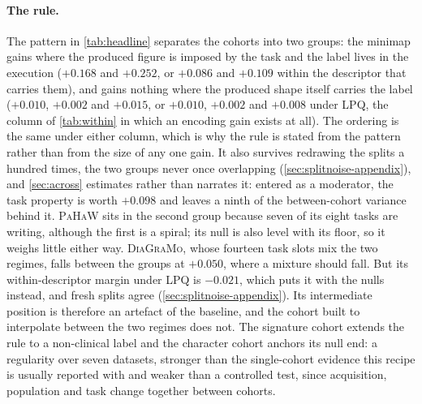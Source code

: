 \documentclass[10pt,a4paper]{article}
\begin{document}
\paragraph{The rule.} The pattern in \cref{tab:headline} separates the cohorts into two groups: the
minimap gains where the produced figure is imposed by the task and the label lives in the execution
($+0.168$ and $+0.252$, or $+0.086$ and $+0.109$ within the descriptor that carries them), and gains
nothing where the produced shape itself carries the label ($+0.010$, $+0.002$ and $+0.015$, or
$+0.010$, $+0.002$ and $+0.008$ under LPQ, the column of \cref{tab:within} in which an encoding gain
exists at all). The ordering is the same under either column, which is why the rule is stated from
the pattern rather than from the size of any one gain. It also survives redrawing the splits a
hundred times, the two groups never once overlapping (\cref{sec:splitnoise-appendix}), and
\cref{sec:across} estimates rather than narrates it: entered as a moderator, the task property is
worth $+0.098$ and leaves a ninth of the between-cohort variance behind it.
\textsc{PaHaW} sits in the second group because seven of its eight
tasks are writing, although the first is a spiral; its null is also level with its floor, so it
weighs little either way. \textsc{DiaGraMo}, whose fourteen task slots mix the two regimes, falls
between the groups at $+0.050$, where a mixture should fall. But its within-descriptor margin
under LPQ is $-0.021$, which puts it with the nulls instead, and fresh splits agree
(\cref{sec:splitnoise-appendix}). Its intermediate position is therefore an artefact of the
baseline, and the cohort built to interpolate between the two regimes does not. The signature cohort
extends the rule to a non-clinical label and the character cohort anchors its null end: a regularity
over seven datasets, stronger than the single-cohort evidence this recipe is usually reported with
and weaker than a controlled test, since acquisition, population and task change together between
cohorts.


\end{document}
